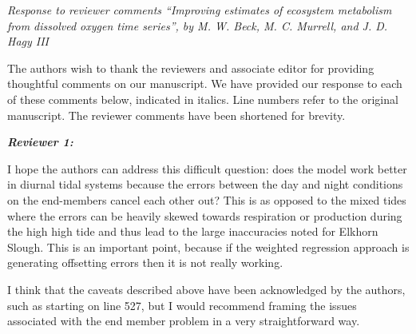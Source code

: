 \documentclass[letterpaper,12pt]{article}\usepackage[]{graphicx}\usepackage[]{color}
\newcommand{\Bigtxt}[1]{\textbf{\textit{#1}}}
\begin{document}
\raggedright


{\it Response to reviewer comments ``Improving estimates of ecosystem metabolism from dissolved oxygen time series'', by M. W. Beck, M. C. Murrell, and J. D. Hagy III}

The authors wish to thank the reviewers and associate editor for providing thoughtful comments on our manuscript.  We have provided our response to each of these comments below, indicated in italics.  Line numbers refer to the original manuscript. The reviewer comments have been shortened for brevity.

\Bigtxt{Reviewer 1:}

I hope the authors can address this difficult question: does the model work better in diurnal tidal systems because the errors between the day and night conditions on the end-members cancel each other out? This is as opposed to the mixed tides where the errors can be heavily skewed towards respiration or production during the high high tide and thus lead to the large inaccuracies noted for Elkhorn Slough. This is an important point, because if the weighted regression approach is generating offsetting errors then it is not really working.

I think that the caveats described above have been acknowledged by the authors, such as starting on line 527, but I would recommend framing the issues associated with the end member problem in a very straightforward way. 
\end{document}
